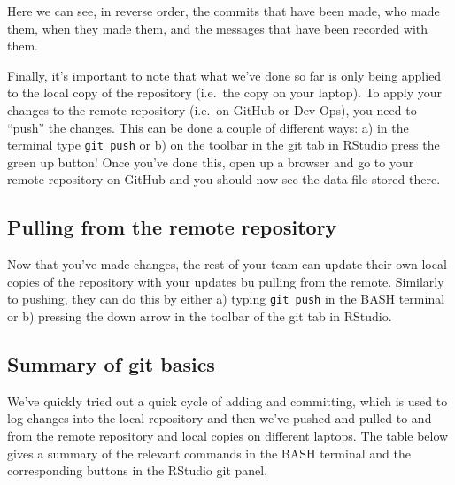 \documentclass[
  12pt,
]{article}
\begin{document}
Here we can see, in reverse order, the commits that have been made, who
made them, when they made them, and the messages that have been recorded
with them.

Finally, it's important to note that what we've done so far is only
being applied to the local copy of the repository (i.e.~the copy on your
laptop). To apply your changes to the remote repository (i.e.~on GitHub
or Dev Ops), you need to ``push'' the changes. This can be done a couple
of different ways: a) in the terminal type \texttt{git\ push} or b) on
the toolbar in the git tab in RStudio press the green up button! Once
you've done this, open up a browser and go to your remote repository on
GitHub and you should now see the data file stored there.

\hypertarget{pulling-from-the-remote-repository}{%
\subsection{Pulling from the remote
repository}\label{pulling-from-the-remote-repository}}

Now that you've made changes, the rest of your team can update their own
local copies of the repository with your updates bu pulling from the
remote. Similarly to pushing, they can do this by either a) typing
\texttt{git\ push} in the BASH terminal or b) pressing the down arrow in
the toolbar of the git tab in RStudio.

\hypertarget{summary-of-git-basics}{%
\subsection{Summary of git basics}\label{summary-of-git-basics}}

We've quickly tried out a quick cycle of adding and committing, which is
used to log changes into the local repository and then we've pushed and
pulled to and from the remote repository and local copies on different
laptops. The table below gives a summary of the relevant commands in the
BASH terminal and the corresponding buttons in the RStudio git panel.
\end{document}
